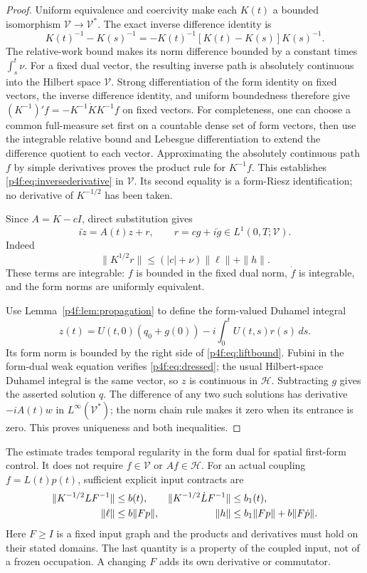 \documentclass[11pt]{article}
\numberwithin{equation}{section}
\theoremstyle{definition}
\theoremstyle{remark}
\begin{document}
\begin{proof}
Uniform equivalence and coercivity make each $K(t)$
a bounded isomorphism $\mathcal V\to\mathcal V^*$.
The exact inverse difference identity is
\[
 K(t)^{-1}-K(s)^{-1}
   =-K(t)^{-1}[K(t)-K(s)]K(s)^{-1}.
\]
The relative-work bound makes its norm difference
bounded by a constant times $\int_s^t\nu$.
For a fixed dual vector, the resulting inverse path is
absolutely continuous into the Hilbert space $\mathcal V$.
Strong differentiation of the form identity on fixed
vectors, the inverse difference identity, and uniform
boundedness therefore give
$(K^{-1})'f=-K^{-1}\dot K K^{-1}f$ on fixed vectors.
For completeness, one can choose a common full-measure
set first on a countable dense set of form vectors,
then use the integrable relative bound and Lebesgue
differentiation to extend the difference quotient to
each vector. Approximating the absolutely continuous
path $f$ by simple derivatives proves the product rule
for $K^{-1}f$. This establishes
\eqref{p4f:eq:inversederivative} in $\mathcal V$.
Its second equality is a form-Riesz identification;
no derivative of $K^{-1/2}$ has been taken.

Since $A=K-cI$, direct substitution gives
\begin{equation}\label{p4f:eq:dressed}
 i\dot z=A(t)z+r,\qquad r=cg+i\dot g\in L^1(0,T;\mathcal V).
\end{equation}
Indeed
\[
 \|K^{1/2}r\|\le (|c|+\nu)\|\ell\|+\|h\|.
\]
These terms are integrable: $f$ is bounded in the
fixed dual norm, $\dot f$ is integrable, and the
form norms are uniformly equivalent.

Use Lemma~\ref{p4f:lem:propagation} to define the
form-valued Duhamel integral
\[
 z(t)=U(t,0)(q_0+g(0))
          -i\int_0^tU(t,s)r(s)\,ds.
\]
Its form norm is bounded by the right side of
\eqref{p4f:eq:liftbound}. Fubini in the form-dual
weak equation verifies \eqref{p4f:eq:dressed};
the usual Hilbert-space Duhamel integral is the same
vector, so $z$ is continuous in $\mathcal H$.
Subtracting $g$ gives the asserted solution $q$.
The difference of any two such solutions has derivative
$-iA(t)w$ in $L^\infty(\mathcal V^*)$; the norm chain
rule makes it zero when its entrance is zero.
This proves uniqueness and both inequalities.
\end{proof}

The estimate trades temporal regularity in the form dual
for spatial first-form control. It does not require
$f\in\mathcal V$ or $Af\in\mathcal H$.
For an actual coupling $f=L(t)p(t)$, sufficient explicit
input contracts are
\begin{align}
 \|K^{-1/2}LF^{-1}\|&\le b(t),&
 \|K^{-1/2}\dot L F^{-1}\|&\le b_1(t),\notag\\
 \|\ell\|&\le b\|Fp\|,&
 \|h\|&\le b_1\|Fp\|+b\|F\dot p\|.
 \label{p4f:eq:inputcontract}
\end{align}
Here $F\ge I$ is a fixed input graph and the products
and derivatives must hold on their stated domains.
The last quantity is a property of the coupled input,
not of a frozen occupation. A changing $F$ adds its
own derivative or commutator.
\end{document}
